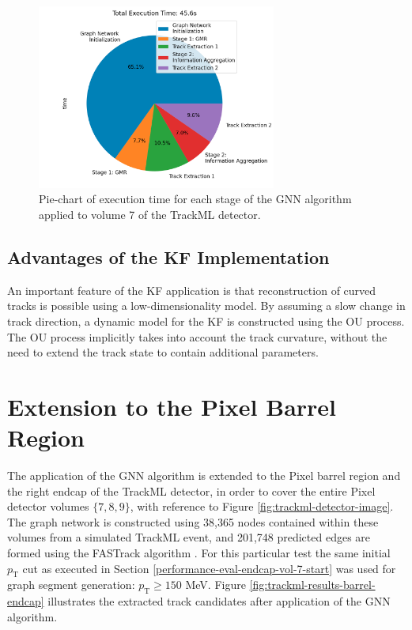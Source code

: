 \begin{figure}[htbp]
    \centering
    \includegraphics[width=0.7\textwidth]{images/7-results/execution-time-endcap-1.png}
    \caption{Pie-chart of execution time for each stage of the GNN algorithm applied to volume 7 of the TrackML detector.}
    \label{fig:execution-time-endcap-1}%
\end{figure}






\subsection{Advantages of the KF Implementation}

An important feature of the KF application is that reconstruction of curved tracks is possible using a low-dimensionality model. By assuming a slow change in track direction, a dynamic model for the KF is constructed using the OU process. The OU process implicitly takes into account the track curvature, without the need to extend the track state to contain additional parameters.







\section{Extension to the Pixel Barrel Region}
\label{chapter-7-outlook}


The application of the GNN algorithm is extended to the Pixel barrel region and the right endcap of the TrackML detector, in order to cover the entire Pixel detector volumes $\{7, 8, 9\}$, with reference to Figure \ref{fig:trackml-detector-image}. The graph network is constructed using 38,365 nodes contained within these volumes from a simulated TrackML event, and 201,748 predicted edges are formed using the FASTrack algorithm \cite{Dmitry-fasttrack-addtest}. For this particular test the same initial $p_{\text{T}}$ cut as executed in Section \ref{performance-eval-endcap-vol-7-start} was used for graph segment generation: $p_{\text{T}} \ge 150$ MeV. Figure \ref{fig:trackml-results-barrel-endcap} illustrates the extracted track candidates after application of the GNN algorithm. 

